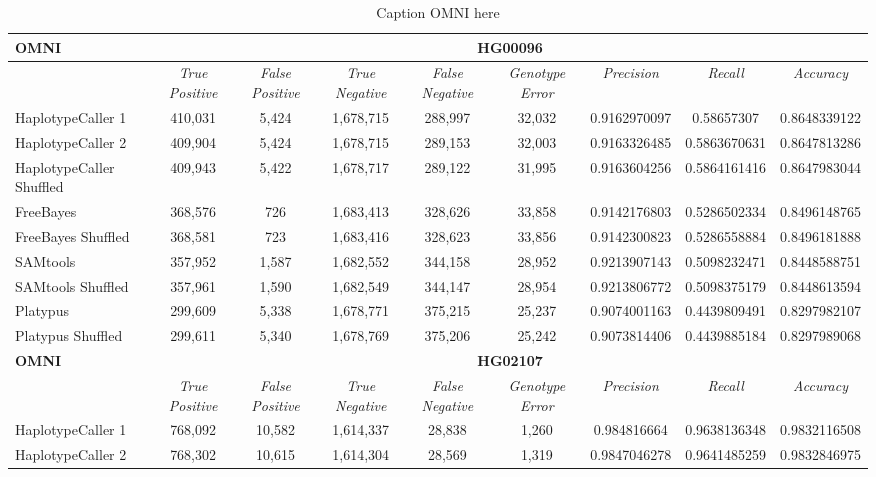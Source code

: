 \begin{table}[htb]
\caption{Caption OMNI here }
\begin{center}
\begin{tabular}{|l||c|c|c|c|c|c|c|c|}
\hline
{\bf OMNI} & \multicolumn{8}{|c|}{\bf HG00096} \\
\hline
\cline{2-8}
{\bf} & {\it True Positive} & {\it False Positive} & {\it True Negative} & {\it False Negative} & {\it Genotype Error} & {\it Precision} & {\it Recall} & {\it Accuracy}\\
\hline
HaplotypeCaller 1 & 410,031 & 5,424 & 1,678,715 & 288,997 & 32,032 & 0.9162970097 & 0.58657307 & 0.8648339122 \\
\hline
HaplotypeCaller 2 & 409,904 & 5,424 & 1,678,715 & 289,153 & 32,003 & 0.9163326485 & 0.5863670631 & 0.8647813286 \\
\hline
HaplotypeCaller Shuffled & 409,943 & 5,422 & 1,678,717 & 289,122 & 31,995 & 0.9163604256 & 0.5864161416 & 0.8647983044 \\
\hline
FreeBayes & 368,576 & 726 & 1,683,413 & 328,626 & 33,858 & 0.9142176803 & 0.5286502334 & 0.8496148765 \\
\hline
FreeBayes Shuffled & 368,581 & 723 & 1,683,416 & 328,623 & 33,856 & 0.9142300823 & 0.5286558884 & 0.8496181888 \\
\hline
SAMtools & 357,952 & 1,587 & 1,682,552 & 344,158 & 28,952 & 0.9213907143 & 0.5098232471 & 0.8448588751 \\
\hline
SAMtools Shuffled & 357,961 & 1,590 & 1,682,549 & 344,147 & 28,954 & 0.9213806772 & 0.5098375179 & 0.8448613594 \\
\hline
Platypus & 299,609 & 5,338 & 1,678,771 & 375,215 & 25,237 & 0.9074001163 & 0.4439809491 & 0.8297982107 \\
\hline
Platypus Shuffled & 299,611 & 5,340 & 1,678,769 & 375,206 & 25,242 & 0.9073814406 & 0.4439885184 & 0.8297989068 \\
\hline
\hline
{\bf OMNI} & \multicolumn{8}{|c|}{\bf HG02107} \\
\hline
\cline{2-8}
{\bf} & {\it True Positive} & {\it False Positive} & {\it True Negative} & {\it False Negative} & {\it Genotype Error} & {\it Precision} & {\it Recall} & {\it Accuracy}\\
\hline
HaplotypeCaller 1 & 768,092 & 10,582 & 1,614,337 & 28,838 & 1,260 & 0.984816664 & 0.9638136348 & 0.9832116508 \\
\hline
HaplotypeCaller 2 & 768,302 & 10,615 & 1,614,304 & 28,569 & 1,319 & 0.9847046278 & 0.9641485259 & 0.9832846975 \\

\end{tabular}
\end{center}
\end{table}
